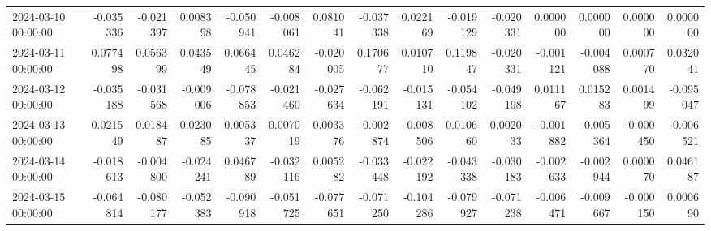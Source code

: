 \begin{tabular}{lrrrrrrrrrrrrrr}
2024-03-10 00:00:00 & -0.035336 & -0.021397 & 0.008398 & -0.050941 & -0.008061 & 0.081041 & -0.037338 & 0.022169 & -0.019129 & -0.020331 & 0.000000 & 0.000000 & 0.000000 & 0.000000 \\
2024-03-11 00:00:00 & 0.077498 & 0.056399 & 0.043549 & 0.066445 & 0.046284 & -0.020005 & 0.170677 & 0.010710 & 0.119847 & -0.020331 & -0.001121 & -0.004088 & 0.000770 & 0.032041 \\
2024-03-12 00:00:00 & -0.035188 & -0.031568 & -0.009006 & -0.078853 & -0.021460 & -0.027634 & -0.062191 & -0.015131 & -0.054102 & -0.049198 & 0.011167 & 0.015283 & 0.001499 & -0.095047 \\
2024-03-13 00:00:00 & 0.021549 & 0.018487 & 0.023085 & 0.005337 & 0.007019 & 0.003376 & -0.002874 & -0.008506 & 0.010660 & 0.002033 & -0.001882 & -0.005364 & -0.000450 & -0.006521 \\
2024-03-14 00:00:00 & -0.018613 & -0.004800 & -0.024241 & 0.046789 & -0.032116 & 0.005282 & -0.033448 & -0.022192 & -0.043338 & -0.030183 & -0.002633 & -0.002944 & 0.000070 & 0.046187 \\
2024-03-15 00:00:00 & -0.064814 & -0.080177 & -0.052383 & -0.090918 & -0.051725 & -0.077651 & -0.071250 & -0.104286 & -0.079927 & -0.071238 & -0.006471 & -0.009667 & -0.000150 & 0.000690 \\
\bottomrule
\end{tabular}
